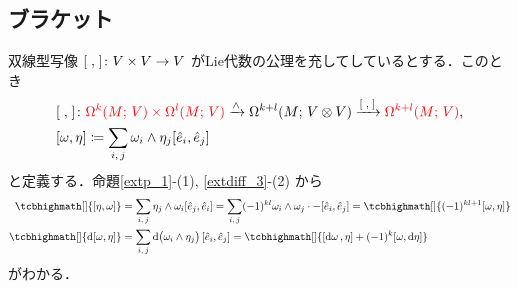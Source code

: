 \documentclass[geometry_main]{subfiles}
\begin{document}
\subsection{ブラケット}

双線型写像 $\comm{\;}{\;} \colon V \times V \to V$ がLie代数の公理を充してしているとする．このとき
\begin{align}
	&\comm{\;}{\;} \colon \textcolor{red}{\Omega^k(M;\, V) \times \Omega^l(M;\, V)} \xrightarrow{\wedge} \Omega^{k+l}(M;\, V \otimes V) \xrightarrow{\comm{\;}{\;}} \textcolor{red}{\Omega^{k+l}(M;\, V)},\\
	&\comm{\omega}{\eta} \coloneqq \sum_{i,\, j} \omega_i \wedge \eta_j \comm{\hat{e}_i}{\hat{e}_j}
\end{align}
と定義する．命題\ref{extp_1}-(1), \ref{extdiff_3}-(2) から
\begin{align}
	\tcbhighmath[]{\comm{\eta}{\omega}} &= \sum_{i,\, j} \eta_j \wedge \omega_i \comm{\hat{e}_j}{\hat{e}_i} = \sum_{i,\, j} (-1)^{kl} \omega_i \wedge \omega_j \cdot -\comm{\hat{e}_i}{\hat{e}_j} = \tcbhighmath[]{(-1)^{kl+1} \comm{\omega}{\eta}} \\
	\tcbhighmath[]{\dd{\comm{\omega}{\eta}}} &= \sum_{i,\, j} \dd{\bigl( \omega_i \wedge \eta_j \bigr)} \comm{\hat{e}_i}{\hat{e}_j} = \tcbhighmath[]{\comm{\dd{\omega}}{\eta} + (-1)^k \comm{\omega}{\dd{\eta}} }
\end{align}
がわかる．
\end{document}
